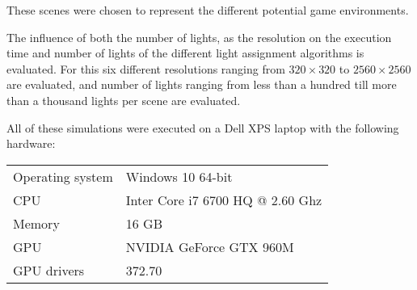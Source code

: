 \noindent These scenes were chosen to represent the different potential game environments.






The influence of both the number of lights, as the resolution on the execution time and
number of lights of the different light assignment algorithms is evaluated. For this six
different resolutions ranging from $320 \times 320$ to $2560 \times 2560$ are evaluated, and
number of lights ranging from less than a hundred till more than a thousand lights per
scene are evaluated.

All of these simulations were executed on a Dell XPS laptop with the following hardware:

\begin{table}[h!]
  \begin{tabular}{@{}ll@{}}\toprule
    Operating system       & Windows 10 64-bit                \\
    CPU & Inter Core i7 6700 HQ @ 2.60 Ghz \\
    Memory & 16 GB                            \\
    GPU & NVIDIA GeForce GTX 960M          \\
    GPU drivers & 372.70                           \\ \bottomrule
  \end{tabular}
\end{table}

